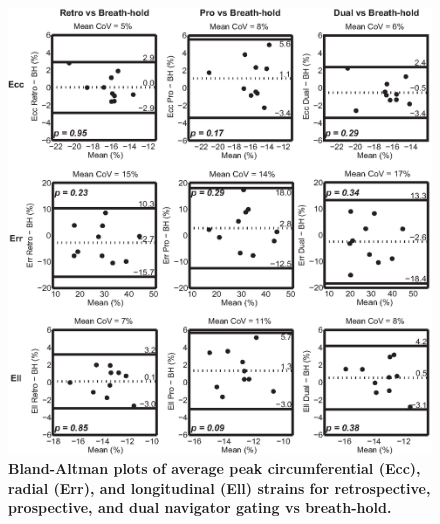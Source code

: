 \begin{figure}
	\centering %
	\includegraphics{figures/navpaper/Fig3}
	\caption[Bland-Altman plots of average peak circumferential (Ecc), radial (Err), and longitudinal (Ell) strains for retrospective, prospective, and dual navigator gating vs breath-hold]{\textbf{Bland-Altman plots of average peak circumferential (Ecc), radial (Err), and longitudinal (Ell) strains for retrospective, prospective, and dual navigator gating vs breath-hold.}}
	\label{fig:nav_strain_bland_altman}
\end{figure}

